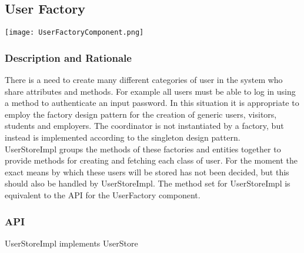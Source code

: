 \documentclass{l3deliverable}
\begin{document}
\subsection{User Factory}
\texttt{[image: UserFactoryComponent.png]}
\subsubsection{Description and Rationale}
There is a need to create many different categories of user in the system who share attributes and methods. For example all users must be able to log in using a method
to authenticate an input password. In this situation it is appropriate to employ the factory design pattern for the creation of generic users, visitors, students and employers.
The coordinator is not instantiated by a factory, but instead is implemented according to the singleton design pattern. \\
UserStoreImpl groups the methods of these factories and entities together to provide methods for creating and fetching each class of user. For the moment the exact 
means by which these users will be stored has not been decided, but this should also be handled by UserStoreImpl. The method set for UserStoreImpl is equivalent to the API for 
the UserFactory component.
\subsubsection{API}
UserStoreImpl implements UserStore
\end{document}
